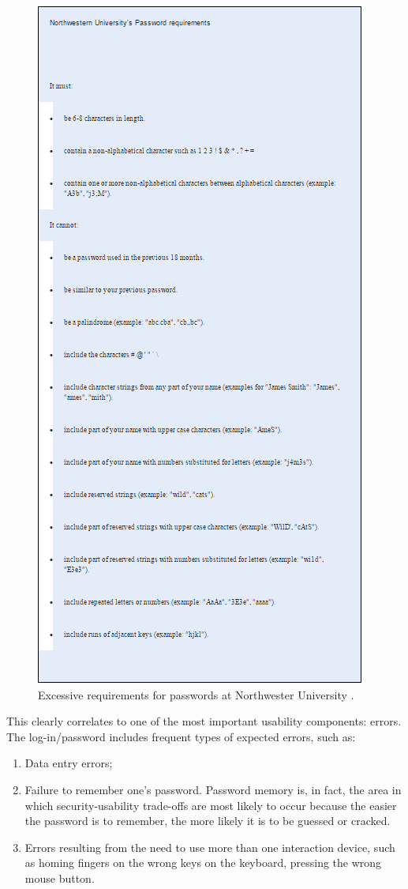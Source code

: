\documentclass{article}
\begin{document}
\begin{figure}
  \centering
    \includegraphics[scale=0.8]{northwestern_password_requirements}
     \caption{Excessive requirements for passwords at Northwester University \cite{norman2009way}.}
\end{figure}

This clearly correlates to one of the most important usability components: errors.  The log-in/password includes frequent types of expected errors, such as:
\begin{enumerate}
\item Data entry errors;
\item Failure to remember one’s password. Password memory is, in fact, the area in which security-usability trade-offs are most likely to occur because the easier the password is to remember, the more likely it is to be guessed or cracked. 
\item Errors resulting from the need to use more than one interaction device, such as homing fingers on the wrong keys on the keyboard, pressing the wrong mouse button. 
\end{enumerate}
\end{document}
